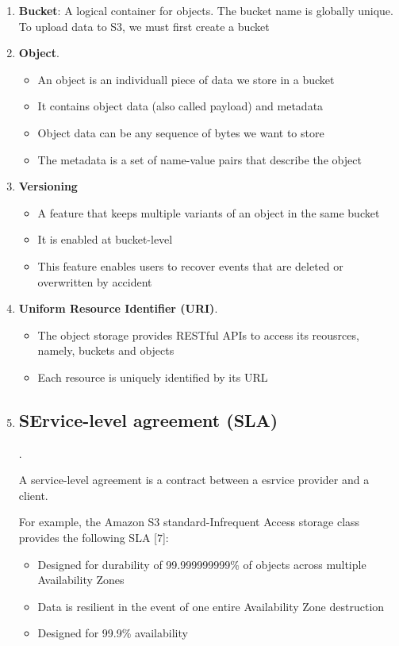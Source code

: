 \documentclass{report}
\theoremstyle{definition}
\let\oldsubsection\subsection
\renewcommand{\subsection}{\oldsubsection*}
\begin{document}
\begin{enumerate}
\item
\textbf{Bucket}: A logical container for objects. The bucket name is globally unique. To upload data to S3, we must first create a bucket
\item
\textbf{Object}.

\begin{itemize}
\item
An object is an individuall piece of data we store in a bucket
\item
It contains object data (also called payload) and metadata
\item
Object data can be any sequence of bytes we want to store
\item
The metadata is a set of name-value pairs that describe the object
\end{itemize}

\item
\textbf{Versioning}

\begin{itemize}
\item
A feature that keeps multiple variants of an object in the same bucket
\item
It is enabled at bucket-level
\item
This feature enables users to recover events that are deleted or overwritten by accident
\end{itemize}

\item
\textbf{Uniform Resource Identifier (URI)}.

\begin{itemize}
\item
The object storage provides RESTful APIs to access its reousrces, namely, buckets and objects
\item
Each resource is uniquely identified by its URL
\end{itemize}

\item
\subsection{SErvice-level agreement (SLA)}.

A service-level agreement is a contract between a esrvice provider and a client.

For example, the Amazon S3 standard-Infrequent Access storage class provides the following SLA [7]:

\begin{itemize}
\item
Designed for durability of 99.999999999\% of objects across multiple Availability Zones
\item
Data is resilient in the event of one entire Availability Zone destruction
\item
Designed for 99.9\% availability
\end{itemize}
\end{enumerate}
\end{document}
